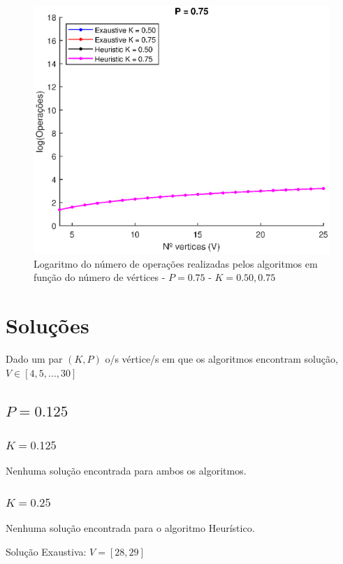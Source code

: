 \documentclass{revdetua}
\begin{document}
\begin{figure}[h!]
\centering
\includegraphics[scale = 0.5]{Figs/4_P075.eps}
\caption{Logaritmo do número de operações realizadas pelos algoritmos em função do número de vértices - $P = 0.75$ - $K = 0.50, 0.75$}
\label{4_P075}
\end{figure}

\clearpage
\section{Soluções}
\label{App_Solut}

Dado um par $(K,P)$ o/s vértice/s em que os algoritmos encontram solução, $V \in [4,5,...,30]$

\subsection{$P = 0.125$}

\subsubsection{$K = 0.125$}
Nenhuma solução encontrada para ambos os algoritmos.

\subsubsection{$K = 0.25$}
Nenhuma solução encontrada para o algoritmo Heurístico.

Solução Exaustiva: $V = [28,29]$
\end{document}
